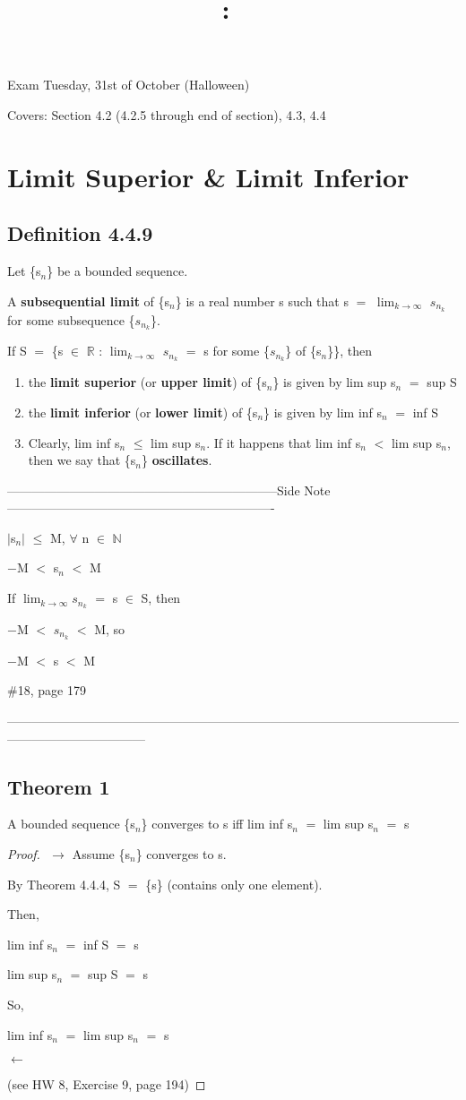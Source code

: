 \documentclass{article}
\title{
    \vspace{2in}
    \textmd{\textbf{\hmwkClass:\ \hmwkTitle}}\\
    \normalsize\vspace{0.1in}\small\vspace{0.1in}\large{\textit{\hmwkClassInstructor}}
    \vspace{3in}
}
\author{\hmwkAuthorName}
\date{}
\newcommand{\mt}[1]{\ensuremath{#1}}
\newcommand\bsc[2][\DefaultOpt]{%
  \def\DefaultOpt{#2}%
  \section[#1]{#2}%
}
\newcommand\ssc[2][\DefaultOpt]{%
  \def\DefaultOpt{#2}%
  \subsection[#1]{#2}%
}
\newcommand{\bgpf}{\begin{proof} $ $\newline}
\newcommand{\balist}{\begin{enumerate}[label=\alph*.]}
\newcommand{\elist}{\end{enumerate}}
\newcommand{\epf}{\end{proof}}
\newcommand{\dbs}[3]{\mt{#1_{#2_#3}}}
\newcommand{\sidenote}[1]{-----------------------------------------------------------------Side Note----------------------------------------------------------------
#1 \

---------------------------------------------------------------------------------------------------------------------------------------------}
\newcommand{\br}{\mt{\mathbb{R}} }       %
\newcommand{\bn}{\mt{\mathbb{N}} }       %
\newcommand{\fa}{\mt{\forall} }          %
\newcommand{\mem}{\mt{\in} }
\newcommand{\lra}{ \mt{\longrightarrow} } %
\newcommand{\lla}{ \mt{\longleftarrow} }  %
\newcommand{\av}[1]{\mt{|}#1\mt{|}}  %
\newcommand{\bk}[1]{\{#1\}}
\newcommand{\ls}{\mt{<} }
\newcommand{\lse}{\mt{\leq} }
\newcommand{\eql}{\mt{=} }
\newcommand{\uw}[2]{#1\mt{_{#2}}}
\newcommand{\lmti}[1]{\mt{\displaystyle{\lim_{#1 \to \infty}}}}
\begin{document}
Exam Tuesday, 31st of October (Halloween)

Covers: Section 4.2 (4.2.5 through end of section), 4.3, 4.4

\bsc{Limit Superior \& Limit Inferior}{

\ssc{Definition 4.4.9}{

Let \bk{\uw{s}{n}} be a bounded sequence.

A \textbf{subsequential limit} of \bk{\uw{s}{n}} is a real number s such that s \eql \lmti{k} \dbs{s}{n}{k} for some subsequence \bk{\dbs{s}{n}{k}}.

If S \eql \bk{s \mem \br : \lmti{k} \dbs{s}{n}{k} \eql s for some \bk{\dbs{s}{n}{k}} of \bk{\uw{s}{n}}}, then

\balist
\item the \textbf{limit superior} (or \textbf{upper limit}) of \bk{\uw{s}{n}} is given by lim sup \uw{s}{n} \eql sup S
\item the \textbf{limit inferior} (or \textbf{lower limit}) of \bk{\uw{s}{n}} is given by lim inf \uw{s}{n} \eql inf S
\item Clearly, lim inf \uw{s}{n} \lse lim sup \uw{s}{n}. If it happens that lim inf \uw{s}{n} \ls lim sup \uw{s}{n}, then we say that \bk{\uw{s}{n}} \textbf{oscillates}.
\elist

}

\sidenote{
\av{\uw{s}{n}} \lse M, \fa n \mem \bn

$-$M \ls \uw{s}{n} \ls M

If \lmti{k}\dbs{s}{n}{k} \eql s \mem S, then

$-$M \ls \dbs{s}{n}{k} \ls M, so

$-$M \ls s \ls M

\#18, page 179
}

\ssc{Theorem 1}{A bounded sequence \bk{\uw{s}{n}} converges to s iff lim inf \uw{s}{n} \eql lim sup \uw{s}{n} \eql s}

\bgpf
\lra 
Assume \bk{\uw{s}{n}} converges to s.

By Theorem 4.4.4, S \eql \bk{s} (contains only one element).

Then, 

lim inf \uw{s}{n} \eql inf S \eql s

lim sup \uw{s}{n} \eql sup S \eql s

So,

lim inf \uw{s}{n} \eql lim sup \uw{s}{n} \eql s

\lla 

(see HW 8, Exercise 9, page 194)

\epf
}
\end{document}
